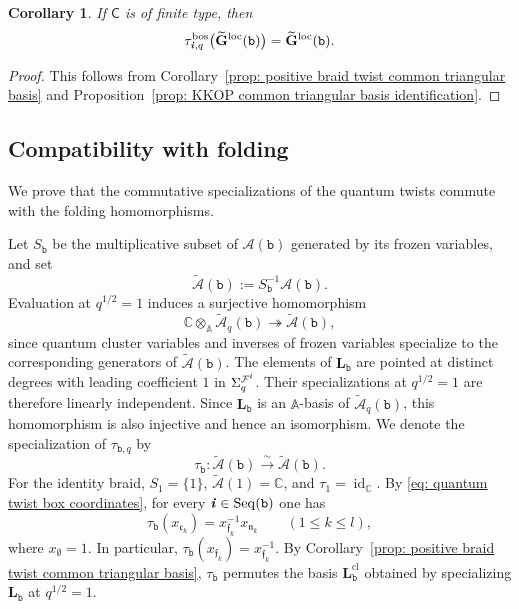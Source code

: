 \documentclass[12pt, leqno]{amsart}
\numberwithin{equation}{section}
\theoremstyle{plain}
\newtheorem{corollary}[lemma]{Corollary}
\theoremstyle{definition}
\renewcommand{\le}{\leqslant}
\newcommand{\seteq}{\mathbin{:=}}
\newcommand{\C}{\mathbb{C}}
\newcommand{\loc}{{\rm loc}}
\newcommand{\ii}{ \textbf{\textit{i}}}
\newcommand{\frakc}{\mathfrak{c}}
\newcommand{\frakf}{\mathfrak{f}}
\newcommand{\frakn}{\mathfrak{n}}
\newcommand{\sfC}{\mathsf{C}}
\newcommand{\bbA}{\mathbb{A}}
\newcommand{\bfG}{\mathbf{G}}
\newcommand{\bfL}{\mathbf{L}}
\newcommand{\tbfG}{\widetilde{\bfG}}
\newcommand{\calA}{\mathcal{A}}
\newcommand{\calF}{\mathcal{F}}
\newcommand{\tcalA}{\widetilde{\calA}}
\newcommand{\ttb}{\mathtt{b}}
\newcommand{\Seq}{\mathrm{Seq}}
\begin{document}
\begin{corollary}
\label{cor: positive braid twist KKOP global basis}
If $\sfC$ is of finite type, then
\[
\tau^{\mathrm{bos}}_{\ii,q}
\bigl(\tbfG^{\loc}(\ttb)\bigr)=\tbfG^{\loc}(\ttb).
\]
\end{corollary}

\begin{proof}
This follows from
Corollary~\ref{prop: positive braid twist common triangular basis} and Proposition~\ref{prop: KKOP common triangular basis identification}.
\end{proof}
 

\subsection{Compatibility with folding}
\label{subsec: arbitrary word DT folding}

We prove that the commutative specializations of the quantum
twists commute with the folding homomorphisms.

Let $S_\ttb$ be the multiplicative subset of $\calA(\ttb)$
generated by its frozen variables, and set
\[
\tcalA(\ttb)\seteq S_\ttb^{-1}\calA(\ttb).
\]
Evaluation at $q^{1/2}=1$ induces a surjective homomorphism
\[
\C\otimes_{\bbA}\tcalA_q(\ttb)
\twoheadrightarrow\tcalA(\ttb),
\]
since quantum cluster variables and inverses of frozen variables
specialize to the corresponding generators of
$\tcalA(\ttb)$.
The elements of $\bfL_\ttb$ are pointed at distinct degrees
with leading coefficient $1$ in $\Sigma_q^{\calF^\ii}$.
Their specializations at $q^{1/2}=1$ are therefore linearly
independent.  Since $\bfL_\ttb$ is an $\bbA$-basis of
$\tcalA_q(\ttb)$, this homomorphism is also injective and hence
an isomorphism.
We denote the specialization of $\tau_{\ttb,q}$ by
\[
\tau_\ttb:\tcalA(\ttb)\xrightarrow{\sim}\tcalA(\ttb).
\]
For the identity braid, $S_1=\{1\}$, $\tcalA(1)=\C$, and
$\tau_1=\operatorname{id}_\C$.
By \eqref{eq: quantum twist box coordinates}, for every
$\ii\in\Seq(\ttb)$ one has
\begin{equation}
\tau_\ttb(x_{\frakc_k})
=x_{\frakf_k}^{-1}x_{\frakn_k}
\qquad(1\le k\le l),
\label{eq: arbitrary positive word DT box formula}
\end{equation}
where $x_\emptyset=1$.
In particular, $\tau_\ttb(x_{\frakf_k})=x_{\frakf_k}^{-1}$.
By Corollary~\ref{prop: positive braid twist common triangular basis},
$\tau_\ttb$ permutes the basis $\bfL_\ttb^{\mathrm{cl}}$
obtained by specializing $\bfL_\ttb$ at $q^{1/2}=1$.
\end{document}
